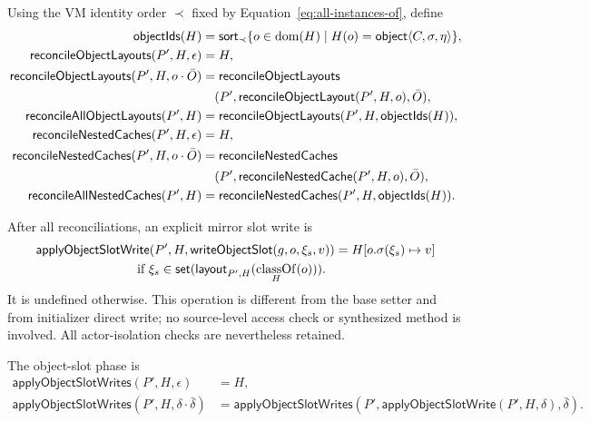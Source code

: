 Using the VM identity order $\prec$ fixed by
Equation~\eqref{eq:all-instances-of}, define
\begin{equation}\label{eq:reconciliation-phases}
\begin{aligned}
 \mathsf{objectIds}(H)
   &=\mathsf{sort}_{\prec}
       \{o\in\mathop{\mathrm{dom}}(H)\mid H(o)=\mathsf{object}\langle C,\sigma,\eta\rangle\},\\
 \mathsf{reconcileObjectLayouts}(P',H,\epsilon)&=H,\\
 \mathsf{reconcileObjectLayouts}(P',H,o\cdot\bar O)
   &=\mathsf{reconcileObjectLayouts}\\
   &\quad(P',\mathsf{reconcileObjectLayout}(P',H,o),\bar O),\\
 \mathsf{reconcileAllObjectLayouts}(P',H)
   &=\mathsf{reconcileObjectLayouts}(P',H,\mathsf{objectIds}(H)),\\
 \mathsf{reconcileNestedCaches}(P',H,\epsilon)&=H,\\
 \mathsf{reconcileNestedCaches}(P',H,o\cdot\bar O)
   &=\mathsf{reconcileNestedCaches}\\
   &\quad(P',\mathsf{reconcileNestedCache}(P',H,o),\bar O),\\
 \mathsf{reconcileAllNestedCaches}(P',H)
   &=\mathsf{reconcileNestedCaches}(P',H,\mathsf{objectIds}(H)).
\end{aligned}
\end{equation}

After all reconciliations, an explicit mirror slot write is
\begin{equation}\label{eq:reflective-object-slot-write}
 \begin{aligned}
 &\mathsf{applyObjectSlotWrite}(P',H,\kw{writeObjectSlot}(g,o,\xi_s,v))
    =H[o.\sigma(\xi_s)\mapsto v]\\
 &\hspace{28mm}\text{if }\xi_s\in
    \mathsf{set}(\mathsf{layout}_{P',H}(\classof_H(o))).
 \end{aligned}
\end{equation}
It is undefined otherwise.  This operation is different from the base setter
and from initializer direct write; no source-level access check or synthesized
method is involved.  All actor-isolation checks are nevertheless retained.

The object-slot phase is
\begin{equation}\label{eq:object-slot-command-fold}
\begin{aligned}
 \mathsf{applyObjectSlotWrites}(P',H,\epsilon)&=H,\\
 \mathsf{applyObjectSlotWrites}(P',H,\delta\cdot\bar\delta)
   &=\mathsf{applyObjectSlotWrites}
       (P',\mathsf{applyObjectSlotWrite}(P',H,\delta),\bar\delta).
\end{aligned}
\end{equation}

